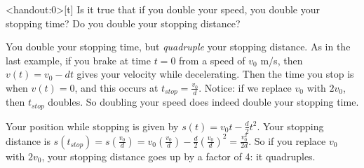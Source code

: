 \begin{frame}<handout:0>[t]
\textcolor{C1}{ Is it true that if you double your speed, you double your stopping time? Do you double your stopping distance?}

\color{answercolor}You double your stopping time, but \textit{quadruple} your stopping distance.
\vfill
As in the last example, if you brake at time $t=0$ from a speed of $v_0$ m/s, then $v(t)=v_0-dt$ gives your velocity while decelerating. Then the time you stop is when $v(t)=0$, and this occurs at $t_{stop}=\frac{v_0}{d}$.
\vfill
Notice: if we replace $v_0$ with $2v_0$, then $t_{stop}$ doubles. So doubling your speed does indeed double your stopping time.\vfill

Your position while stopping is given by $s(t)=v_0t-\frac{d}{2}t^2$. Your stopping distance is $s(t_{stop})=s\left( \frac{v_0}{d}\right)
=v_0\left( \frac{v_0}{d}\right)-\frac{d}{2}\left( \frac{v_0}{d}\right)^2 =\frac{v_0^2}{2d}$. So if you replace $v_0$ with $2v_0$, your stopping distance goes up by a factor of 4: it quadruples.\vfill
\end{frame}
